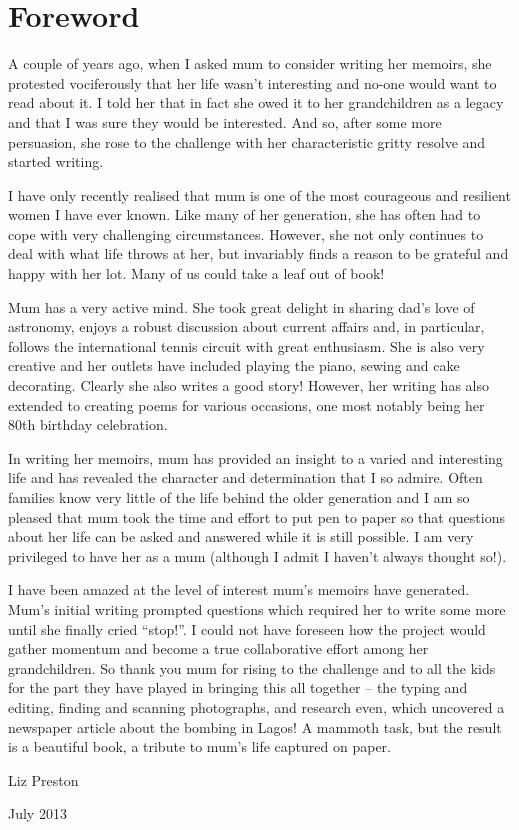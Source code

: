 \chapter{Foreword}

A couple of years ago, when I asked mum to consider writing her
memoirs, she protested vociferously that her life wasn't interesting
and no-one would want to read about it. I told her that in fact she
owed it to her grandchildren as a legacy and that I was sure they
would be interested. And so, after some more persuasion, she rose to
the challenge with her characteristic gritty resolve and started
writing.

I have only recently realised that mum is one of the most courageous
and resilient women I have ever known. Like many of her generation,
she has often had to cope with very challenging
circumstances. However, she not only continues to deal with what life
throws at her, but invariably finds a reason to be grateful and happy
with her lot. Many of us could take a leaf out of book!

Mum has a very active mind. She took great delight in sharing dad's
love of astronomy, enjoys a robust discussion about current affairs
and, in particular, follows the international tennis circuit with
great enthusiasm. She is also very creative and her outlets have
included playing the piano, sewing and cake decorating. Clearly she
also writes a good story!  However, her writing has also extended to
creating poems for various occasions, one most notably being her 80th
birthday celebration.

In writing her memoirs, mum has provided an insight to a varied and
interesting life and has revealed the character and determination that
I so admire. Often families know very little of the life behind the
older generation and I am so pleased that mum took the time and effort
to put pen to paper so that questions about her life can be asked and
answered while it is still possible. I am very privileged to have her
as a mum (although I admit I haven't always thought so!).

I have been amazed at the level of interest mum's memoirs have
generated. Mum's initial writing prompted questions which required her
to write some more until she finally cried ``stop!''. I could not have
foreseen how the project would gather momentum and become a true
collaborative effort among her grandchildren. So thank you mum for
rising to the challenge and to all the kids for the part they have
played in bringing this all together -- the typing and editing,
finding and scanning photographs, and research even, which uncovered a
newspaper article about the bombing in Lagos! A mammoth task, but the
result is a beautiful book, a tribute to mum's life captured on paper.

Liz Preston

July 2013
